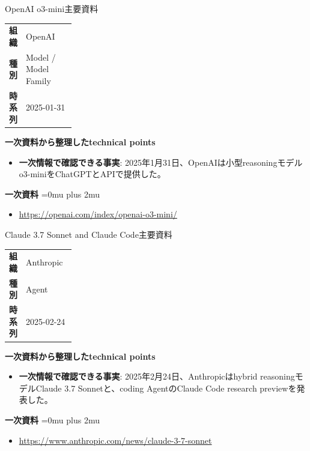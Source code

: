 \begin{technicalnote}{OpenAI o3-mini}{主要資料}
\begingroup
\begin{tabularx}{\linewidth}{@{}>{\bfseries}p{0.22\linewidth}X@{}}
組織 & OpenAI \\
種別 & Model / Model Family \\
時系列 & 2025-01-31 \\
\end{tabularx}
\smallskip
{\bfseries 一次資料から整理したtechnical points}
\begin{itemize}[leftmargin=1.5em,itemsep=0.35em]
\item \textbf{一次情報で確認できる事実}: 2025年1月31日、OpenAIは小型reasoningモデルo3-miniをChatGPTとAPIで提供した。
\end{itemize}
\begin{samepage}
{\bfseries 一次資料}
\begingroup\sloppy
\Urlmuskip=0mu plus 2mu\relax
\begin{itemize}[leftmargin=1.5em,itemsep=0.25em]
\item {\scriptsize\url{https://openai.com/index/openai-o3-mini/}}
\end{itemize}
\endgroup
\end{samepage}
\endgroup
\end{technicalnote}
\medskip

\begin{technicalnote}{Claude 3.7 Sonnet and Claude Code}{主要資料}
\begingroup
\begin{tabularx}{\linewidth}{@{}>{\bfseries}p{0.22\linewidth}X@{}}
組織 & Anthropic \\
種別 & Agent \\
時系列 & 2025-02-24 \\
\end{tabularx}
\smallskip
{\bfseries 一次資料から整理したtechnical points}
\begin{itemize}[leftmargin=1.5em,itemsep=0.35em]
\item \textbf{一次情報で確認できる事実}: 2025年2月24日、Anthropicはhybrid reasoningモデルClaude 3.7 Sonnetと、coding AgentのClaude Code research previewを発表した。
\end{itemize}
\begin{samepage}
{\bfseries 一次資料}
\begingroup\sloppy
\Urlmuskip=0mu plus 2mu\relax
\begin{itemize}[leftmargin=1.5em,itemsep=0.25em]
\item {\scriptsize\url{https://www.anthropic.com/news/claude-3-7-sonnet}}
\end{itemize}
\endgroup
\end{samepage}
\endgroup
\end{technicalnote}
\medskip

